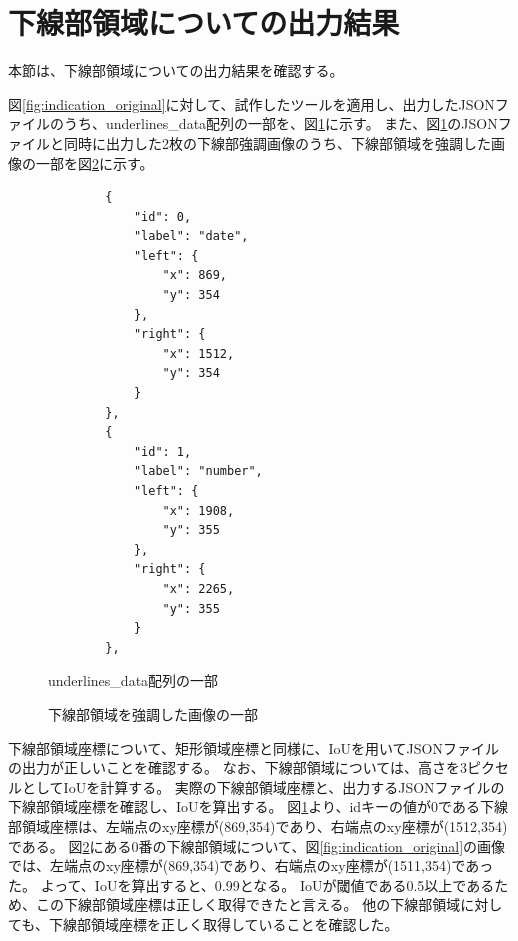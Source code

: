 \section{下線部領域についての出力結果}\label{sec:result_underline}
本節は、下線部領域についての出力結果を確認する。

図\ref{fig:indication_original}に対して、試作したツールを適用し、出力したJSONファイルのうち、underlines\_data配列の一部を、図\ref{fig:underlines_data_json}に示す。
また、図\ref{fig:underlines_data_json}のJSONファイルと同時に出力した2枚の下線部強調画像のうち、下線部領域を強調した画像の一部を図\ref{fig:highlighted_underlines_part}に示す。

\lstset{language=}
\begin{figure}[tp]
    \begin{lstlisting}
        {
            "id": 0,
            "label": "date",
            "left": {
                "x": 869,
                "y": 354
            },
            "right": {
                "x": 1512,
                "y": 354
            }
        },
        {
            "id": 1,
            "label": "number",
            "left": {
                "x": 1908,
                "y": 355
            },
            "right": {
                "x": 2265,
                "y": 355
            }
        },
    \end{lstlisting}
    \caption{underlines\_data配列の一部}\label{fig:underlines_data_json}
\end{figure}

\begin{figure}[tp]
    \begin{center}
        \caption{下線部領域を強調した画像の一部}
        \label{fig:highlighted_underlines_part}
    \end{center}
\end{figure}

下線部領域座標について、矩形領域座標と同様に、IoUを用いてJSONファイルの出力が正しいことを確認する。
なお、下線部領域については、高さを3ピクセルとしてIoUを計算する。
実際の下線部領域座標と、出力するJSONファイルの下線部領域座標を確認し、IoUを算出する。
図\ref{fig:underlines_data_json}より、idキーの値が0である下線部領域座標は、左端点のxy座標が(869,354)であり、右端点のxy座標が(1512,354)である。
図\ref{fig:highlighted_underlines_part}にある0番の下線部領域について、図\ref{fig:indication_original}の画像では、左端点のxy座標が(869,354)であり、右端点のxy座標が(1511,354)であった。
よって、IoUを算出すると、0.99となる。
IoUが閾値である0.5以上であるため、この下線部領域座標は正しく取得できたと言える。
他の下線部領域に対しても、下線部領域座標を正しく取得していることを確認した。

